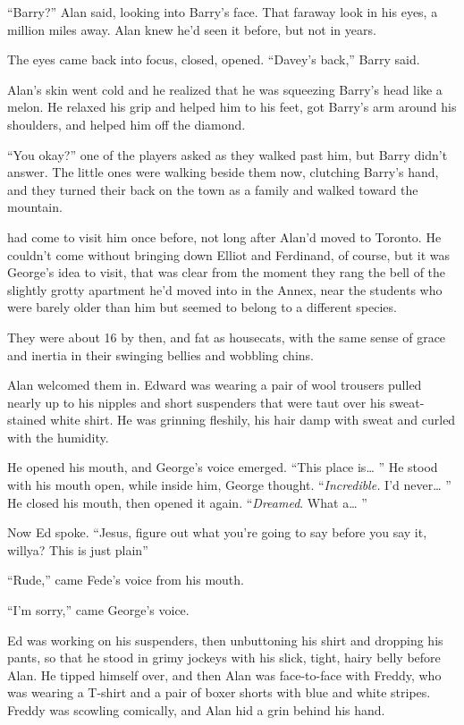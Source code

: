 ``Barry?'' Alan said, looking into Barry's face.  That faraway look in
his eyes, a million miles away.  Alan knew he'd seen it before, but
not in years.

The eyes came back into focus, closed, opened.  ``Davey's back,''
Barry said.

Alan's skin went cold and he realized that he was squeezing Barry's
head like a melon.  He relaxed his grip and helped him to his feet,
got Barry's arm around his shoulders, and helped him off the diamond.

``You okay?'' one of the players asked as they walked past him, but
Barry didn't answer.  The little ones were walking beside them now,
clutching Barry's hand, and they turned their back on the town as a
family and walked toward the mountain.

 had come to visit him once before, not long after Alan'd moved
to Toronto.  He couldn't come without bringing down Elliot and
Ferdinand, of course, but it was George's idea to visit, that was
clear from the moment they rang the bell of the slightly grotty
apartment he'd moved into in the Annex, near the students who were
barely older than him but seemed to belong to a different species.

They were about 16 by then, and fat as housecats, with the same sense
of grace and inertia in their swinging bellies and wobbling chins.

Alan welcomed them in.  Edward was wearing a pair of wool trousers
pulled nearly up to his nipples and short suspenders that were taut
over his sweat-stained white shirt.  He was grinning fleshily, his
hair damp with sweat and curled with the humidity.

He opened his mouth, and George's voice emerged.  ``This place is\ldots{} 
'' He stood with his mouth open, while inside him, George thought. 
``\textit{Incredible.} I'd never\ldots{}  '' He closed his mouth, then
opened it again.  ``\textit{Dreamed}.  What a\ldots{}  ''

Now Ed spoke.  ``Jesus, figure out what you're going to say before you
say it, willya?  This is just plain\dash{}''

``Rude,'' came Fede's voice from his mouth.

``I'm sorry,'' came George's voice.

Ed was working on his suspenders, then unbuttoning his shirt and
dropping his pants, so that he stood in grimy jockeys with his slick,
tight, hairy belly before Alan.  He tipped himself over, and then Alan
was face-to-face with Freddy, who was wearing a T-shirt and a pair of
boxer shorts with blue and white stripes.  Freddy was scowling
comically, and Alan hid a grin behind his hand.

